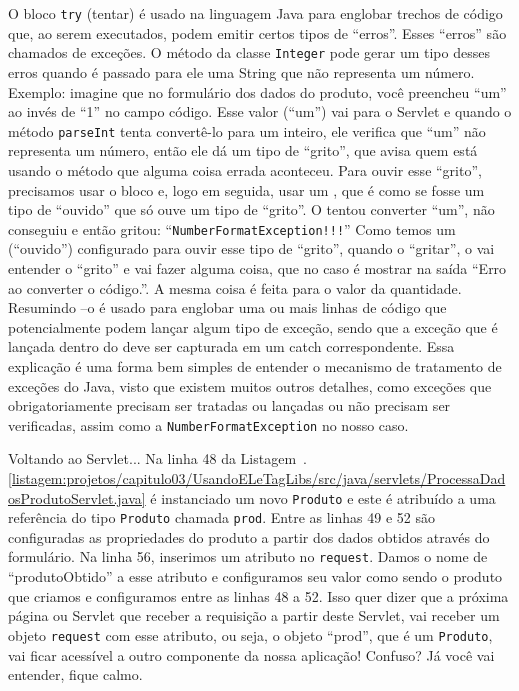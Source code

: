 O bloco \texttt{try} (tentar) é usado na linguagem Java para englobar trechos de código que, ao serem executados, podem emitir certos tipos de ``erros''. Esses ``erros'' são chamados de exceções. O método  da classe \texttt{Integer} pode gerar um tipo desses erros quando é passado para ele uma String que não representa um número. Exemplo: imagine que no formulário dos dados do produto, você preencheu ``um'' ao invés de ``1'' no campo código. Esse valor (``um'') vai para o Servlet e quando o método \texttt{parseInt} tenta convertê-lo para um inteiro, ele verifica que ``um'' não representa um número, então ele dá um tipo de ``grito'', que avisa quem está usando o método que alguma coisa errada aconteceu. Para ouvir esse ``grito'', precisamos usar o bloco  e, logo em seguida, usar um , que é como se fosse um tipo de ``ouvido'' que só ouve um tipo de ``grito''. O  tentou converter ``um'', não conseguiu e então gritou: ``\texttt{NumberFormatException!!!}'' Como temos um  (``ouvido'') configurado para ouvir esse tipo de ``grito'', quando o  ``gritar'', o  vai entender o ``grito'' e vai fazer alguma coisa, que no caso é mostrar na saída ``Erro ao converter o código.''. A mesma coisa é feita para o valor da quantidade. Resumindo –o  é usado para englobar uma ou mais linhas de código que potencialmente podem lançar algum tipo de exceção, sendo que a exceção que é lançada dentro do  deve ser capturada em um catch correspondente. Essa explicação é uma forma bem simples de entender o mecanismo de tratamento de exceções do Java, visto que existem muitos outros detalhes, como exceções que obrigatoriamente precisam ser tratadas ou lançadas ou não precisam ser verificadas, assim como a \texttt{NumberFormatException} no nosso caso.

Voltando ao Servlet... Na linha 48 da Listagem~\thechapter.\ref{listagem:projetos/capitulo03/UsandoELeTagLibs/src/java/servlets/ProcessaDadosProdutoServlet.java} é instanciado um novo \texttt{Produto} e este é atribuído a uma referência do tipo \texttt{Produto} chamada \texttt{prod}. Entre as linhas 49 e 52 são configuradas as propriedades do produto a partir dos dados obtidos através do formulário. Na linha 56, inserimos um atributo no \texttt{request}. Damos o nome de ``produtoObtido'' a esse atributo e configuramos seu valor como sendo o produto que criamos e configuramos entre as linhas 48 a 52. Isso quer dizer que a próxima página ou Servlet que receber a requisição a partir deste Servlet, vai receber um objeto \texttt{request} com esse atributo, ou seja, o objeto ``prod'', que é um \texttt{Produto}, vai ficar acessível a outro componente da nossa aplicação! Confuso? Já você vai entender, fique calmo.

